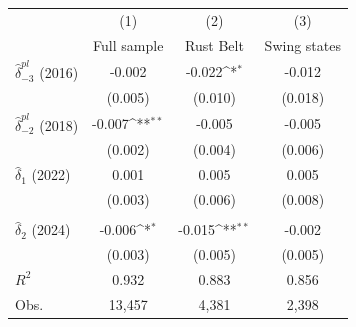 {
\def\sym#1{\ifmmode^{#1}\else\(^{#1}\)\fi}
\begin{tabular}{l*{3}{c}}
\toprule
                         &\multicolumn{1}{c}{(1)}         &\multicolumn{1}{c}{(2)}         &\multicolumn{1}{c}{(3)}         \\
                         & Full sample         &   Rust Belt         &Swing states         \\
\midrule
$\hat{\delta}_{-3}^{pl}$ (2016)&      -0.002         &      -0.022\sym{*}  &      -0.012         \\
                         &     (0.005)         &     (0.010)         &     (0.018)         \\
\addlinespace
$\hat{\delta}_{-2}^{pl}$ (2018)&      -0.007\sym{**} &      -0.005         &      -0.005         \\
                         &     (0.002)         &     (0.004)         &     (0.006)         \\
\addlinespace
$\hat{\delta}_{1}$ (2022)&       0.001         &       0.005         &       0.005         \\
                         &     (0.003)         &     (0.006)         &     (0.008)         \\
\addlinespace
\addlinespace            &                     &                     &                     \\
\addlinespace
$\hat{\delta}_2$ (2024)  &      -0.006\sym{*}  &      -0.015\sym{**} &      -0.002         \\
                         &     (0.003)         &     (0.005)         &     (0.005)         \\
\midrule
\(R^{2}\)                &       0.932         &       0.883         &       0.856         \\
Obs.                     &      13,457         &       4,381         &       2,398         \\
\bottomrule
\end{tabular}
}
